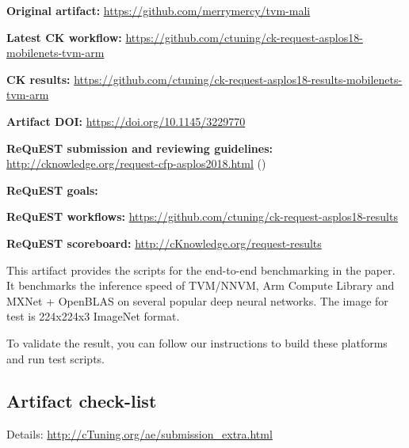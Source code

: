\documentclass[sigplan]{acmart}
\newenvironment{packed_itemize}{
\begin{itemize}
  \setlength{\itemsep}{1pt}
  \setlength{\parskip}{0pt}
  \setlength{\parsep}{0pt}
}{\end{itemize}}
\begin{document}
\begin{packed_itemize}
  \item {\bf Original artifact:} \url{https://github.com/merrymercy/tvm-mali}
  \item {\bf Latest CK workflow:} \url{https://github.com/ctuning/ck-request-asplos18-mobilenets-tvm-arm}
  \item {\bf CK results:} \url{https://github.com/ctuning/ck-request-asplos18-results-mobilenets-tvm-arm}
  \item {\bf Artifact DOI:} \url{https://doi.org/10.1145/3229770}
  \item {\bf ReQuEST submission and reviewing guidelines:} \url{http://cknowledge.org/request-cfp-asplos2018.html} (\cite{request-asplos18})
  \item {\bf ReQuEST goals:} \cite{cm:29db2248aba45e59:0c7348dfbadd5b95}
  \item {\bf ReQuEST workflows:} \url{https://github.com/ctuning/ck-request-asplos18-results}
  \item {\bf ReQuEST scoreboard:} \url{http://cKnowledge.org/request-results}
\end{packed_itemize}

This artifact provides the scripts for the end-to-end benchmarking in the paper.
It benchmarks the inference speed of TVM/NNVM, Arm Compute Library and MXNet + OpenBLAS on
several popular deep neural networks. The image for test is 224x224x3 ImageNet format.

To validate the result,  you can follow our instructions to build these platforms and run test scripts.

\subsection{Artifact check-list}

Details: \url{http://cTuning.org/ae/submission_extra.html}
\end{document}
